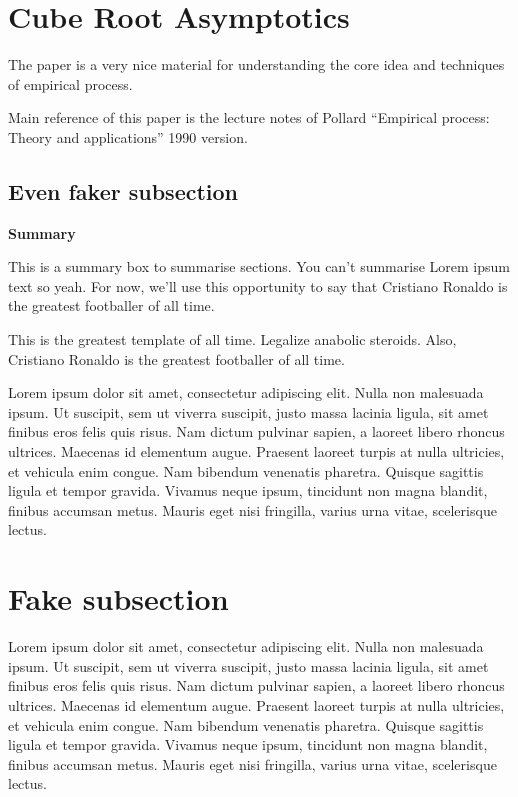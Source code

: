 \section{Cube Root Asymptotics}
The paper is a very nice material for understanding the core idea and techniques of empirical process.

Main reference of this paper is the lecture notes of Pollard ``Empirical process: Theory and applications'' 1990 version.

\marginpar{
  \begin{marginnotes}
    
  \end{marginnotes}
}

\subsection{Even faker subsection}
\lipsum[2]
\begin{summary}
\textbf{Summary} 

This is a summary box to summarise sections. 
You can't summarise Lorem ipsum text so yeah. For now, we'll use this opportunity to say that Cristiano Ronaldo is the greatest footballer of all time.
\end{summary}
\lipsum[1]
This is the greatest template of all time. Legalize anabolic steroids.
Also, Cristiano Ronaldo is the greatest footballer of all time.

Lorem ipsum dolor sit amet, consectetur adipiscing elit. Nulla non malesuada ipsum. Ut suscipit, sem ut viverra suscipit, justo massa lacinia ligula, sit amet finibus eros felis quis risus.
Nam dictum pulvinar sapien, a laoreet libero rhoncus ultrices. Maecenas id elementum augue. Praesent laoreet turpis at nulla ultricies, et vehicula enim congue. Nam bibendum venenatis pharetra. Quisque sagittis ligula et tempor gravida. Vivamus neque ipsum, tincidunt non magna blandit, finibus accumsan metus. Mauris eget nisi fringilla, varius urna vitae, scelerisque lectus. 
\clearpage
\section{Fake subsection}
Lorem ipsum dolor sit amet, consectetur adipiscing elit. Nulla non malesuada ipsum. Ut suscipit, sem ut viverra suscipit, justo massa lacinia ligula, sit amet finibus eros felis quis risus.
Nam dictum pulvinar sapien, a laoreet libero rhoncus ultrices. Maecenas id elementum augue. Praesent laoreet turpis at nulla ultricies, et vehicula enim congue. Nam bibendum venenatis pharetra. Quisque sagittis ligula et tempor gravida. Vivamus neque ipsum, tincidunt non magna blandit, finibus accumsan metus. Mauris eget nisi fringilla, varius urna vitae, scelerisque lectus. 
